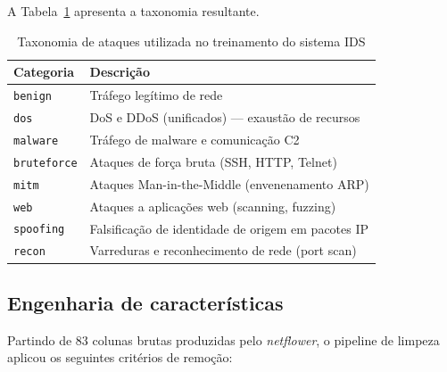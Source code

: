 \documentclass[12pt]{article}
\begin{document}
A Tabela~\ref{tab:taxonomy} apresenta a taxonomia resultante.

\begin{table}[ht]
\centering
\caption{Taxonomia de ataques utilizada no treinamento do sistema IDS}
\label{tab:taxonomy}
\begin{tabular}{@{}ll@{}}
\toprule
\textbf{Categoria} & \textbf{Descrição} \\ \midrule
\texttt{benign}     & Tráfego legítimo de rede \\
\texttt{dos}        & DoS e DDoS (unificados) — exaustão de recursos \\
\texttt{malware}    & Tráfego de malware e comunicação C2 \\
\texttt{bruteforce} & Ataques de força bruta (SSH, HTTP, Telnet) \\
\texttt{mitm}       & Ataques Man-in-the-Middle (envenenamento ARP) \\
\texttt{web}        & Ataques a aplicações web (scanning, fuzzing) \\
\texttt{spoofing}   & Falsificação de identidade de origem em pacotes IP \\
\texttt{recon}      & Varreduras e reconhecimento de rede (port scan) \\ \bottomrule
\end{tabular}
\end{table}

\subsection{Engenharia de características}

Partindo de 83 colunas brutas produzidas pelo \textit{netflower}, o pipeline
de limpeza aplicou os seguintes critérios de remoção:
\end{document}
